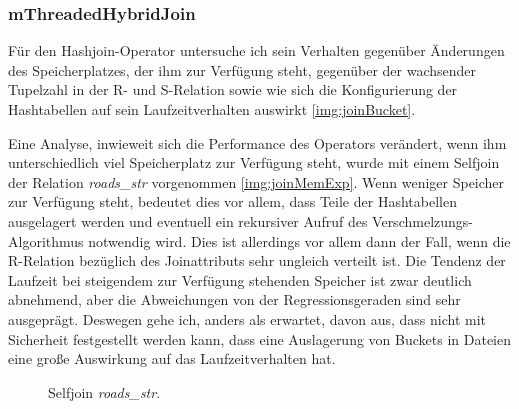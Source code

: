 \documentclass[a4paper,12pt,twoside]{article}
\newcommand{\Fb}[1]{\textit{#1}} %
\begin{document}
\subsubsection{mThreadedHybridJoin}
\label{exp:hash}

Für den Hashjoin-Operator untersuche ich sein Verhalten gegenüber Änderungen des Speicherplatzes, der ihm zur Verfügung steht, gegenüber der wachsender Tupelzahl in der R- und S-Relation sowie wie sich die Konfigurierung der Hashtabellen auf sein Laufzeitverhalten auswirkt \autoref{img:joinBucket}.

Eine Analyse, inwieweit sich die Performance des Operators verändert, wenn ihm unterschiedlich viel Speicherplatz zur Verfügung steht, wurde mit einem Selfjoin der Relation \Fb{roads\_str} vorgenommen \autoref{img:joinMemExp}. Wenn weniger Speicher zur Verfügung steht, bedeutet dies vor allem, dass Teile der Hashtabellen ausgelagert werden und eventuell ein rekursiver Aufruf des Verschmelzungs-Algorithmus notwendig wird. Dies ist allerdings vor allem dann der Fall, wenn die R-Relation bezüglich des Joinattributs sehr ungleich verteilt ist. Die Tendenz der Laufzeit bei steigendem zur Verfügung stehenden Speicher ist zwar deutlich abnehmend, aber die Abweichungen von der Regressionsgeraden sind sehr ausgeprägt. Deswegen gehe ich, anders als erwartet, davon aus, dass nicht mit Sicherheit festgestellt werden kann, dass eine Auslagerung von Buckets in Dateien eine große Auswirkung auf das Laufzeitverhalten hat.

\begin{figure}
	\centering
	\qquad	
	\caption{Selfjoin \Fb{roads\_str}.}
	\label{img:joinExpAllg}
\end{figure}
\end{document}
